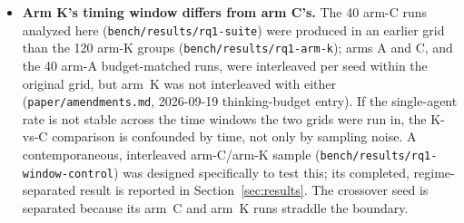 \begin{itemize}
\item \textbf{Arm K's timing window differs from arm C's.} The 40 arm-C runs analyzed here
  (\texttt{bench/results/rq1-suite}) were produced in an earlier grid than the 120 arm-K groups
  (\texttt{bench/results/rq1-arm-k}); arms A and C, and the 40 arm-A budget-matched runs, were
  interleaved per seed within the original grid, but arm~K was not interleaved with either
  (\texttt{paper/amendments.md}, 2026-09-19 thinking-budget entry). If the single-agent rate is not
  stable across the time windows the two grids were run in, the K-vs-C comparison is confounded by time,
  not only by sampling noise. A contemporaneous, interleaved arm-C/arm-K sample
  (\texttt{bench/results/rq1-window-control}) was designed specifically to test this; its completed, regime-separated result is reported in Section~\ref{sec:results}. The crossover
  seed is separated because its arm~C and arm~K runs straddle the boundary.


\end{itemize}
